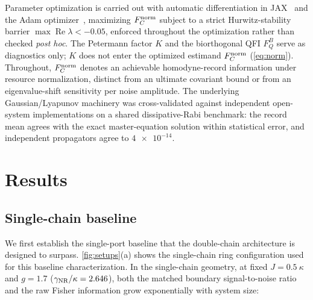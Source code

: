 \documentclass[aps,prxquantum,preprint,superscriptaddress,amsmath,amssymb]{revtex4-2}
\newcommand{\Real}{\operatorname{Re}}
\newcommand{\Fnorm}{F_C^{\rm norm}}
\newcommand{\gNR}{\gamma_{\rm NR}}
\begin{document}
Parameter optimization is carried out with automatic differentiation in JAX~\citep{Bradbury2018} and the Adam optimizer~\citep{Kingma2014,Leung2017}, maximizing $\Fnorm$ subject to a strict Hurwitz-stability barrier $\max\Real\lambda<\num{-0.05}$, enforced throughout the optimization rather than checked \emph{post hoc}. The Petermann factor $K$ and the biorthogonal QFI $F_Q^B$ serve as diagnostics only; $K$ does not enter the optimized estimand $\Fnorm$ (\cref{eq:norm}). Throughout, $\Fnorm$ denotes an achievable homodyne-record information under resource normalization, distinct from an ultimate covariant bound or from an eigenvalue-shift sensitivity per noise amplitude. The underlying Gaussian/Lyapunov machinery was cross-validated against independent open-system implementations on a shared dissipative-Rabi benchmark: the record mean agrees with the exact master-equation solution within statistical error, and independent propagators agree to $\num{4e-14}$.

\section{Results}
\label{sec:results}

\subsection{Single-chain baseline}
\label{sec:single}

We first establish the single-port baseline that the double-chain architecture is designed to surpass. \cref{fig:setups}(a) shows the single-chain ring configuration used for this baseline characterization. In the single-chain geometry, at fixed $J=\qty{0.5}{\kappa}$ and $g=\num{1.7}$ ($\gNR/\kappa=\num{2.646}$), both the matched boundary signal-to-noise ratio and the raw Fisher information grow exponentially with system size:
\end{document}
